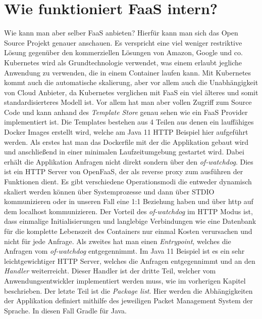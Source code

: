 \documentclass[12pt, a4paper]{article}
\begin{document}
\section{Wie funktioniert FaaS intern?}
Wie kann man aber selber \ac{FaaS} anbieten?
\newline
Hierfür kann man sich das Open Source Projekt \cite[OpenFaaS]{openfaas_github} genauer anschauen.
Es verspricht eine viel weniger restriktive Lösung gegenüber den kommerziellen Lösungen von Amazon, Google und co.
Kubernetes wird als Grundtechnologie verwendet, was einem erlaubt jegliche Anwendung zu verwenden, die in einem Container laufen kann.
Mit Kubernetes kommt auch die automatische skalierung, aber vor allem auch die Unabhängigkeit von Cloud Anbieter, da Kubernetes verglichen mit \ac{FaaS} ein viel älteres und somit standardisierteres Modell ist.
\newline
Vor allem hat man aber vollen Zugriff zum Source Code und kann anhand des \emph{Template Store}\cite{openfaas_templateStore} genau sehen wie ein \ac{FaaS} Provider implementiert ist.
Die Templates bestehen aus 4 Teilen aus denen ein lauffähiges Docker Images erstellt wird, welche am Java 11 HTTP Beispiel \cite{openfaas_templateStore_java11} hier aufgeführt werden.
\newline
\newline
Als erstes hat man das Dockerfile mit der die Applikation gebaut wird und anschließend in einer minimalen Laufzeitumgebung gestartet wird.
\newline
Dabei erhält die Applikation Anfragen nicht direkt sondern über den \emph{of-watchdog}\cite{openfaas_ofWatchdog}.
Dies ist ein HTTP Server von OpenFaaS, der als reverse proxy zum ausführen der Funktionen dient.
Es gibt verschiedene Operationsmodi die entweder dynamisch skaliert werden können über Systemprozesse und dann über STDIO kommunizieren oder in unseren Fall eine 1:1 Beziehung haben und über http auf dem localhost kommunizieren.
Der Vorteil des \emph{of-watchdog} im HTTP Modus ist, dass einmalige Initialisierungen und langlebige Verbindungen wie eine Datenbank für die komplette Lebenszeit des Containers nur einmal Kosten verursachen und nicht für jede Anfrage.
\newline
\newline
Als zweites hat man einen \emph{Entrypoint}, welches die Anfragen vom \emph{of-watchdog} entgegennimmt. Im Java 11 Beispiel ist es ein sehr leichtgewichtiger HTTP Server, welches die Anfragen entgegennimmt und an den \emph{Handler} weiterreicht.
\newline
Dieser Handler ist der dritte Teil, welcher vom Anwendungsentwickler implementiert werden muss, wie im vorherigen Kapitel beschrieben.
\newline
\newline
Der letzte Teil ist die \emph{Package list}.
Hier werden die Abhängigkeiten der Applikation definiert mithilfe des jeweiligen Packet Management System der Sprache.
In diesen Fall Gradle für Java.
\end{document}
